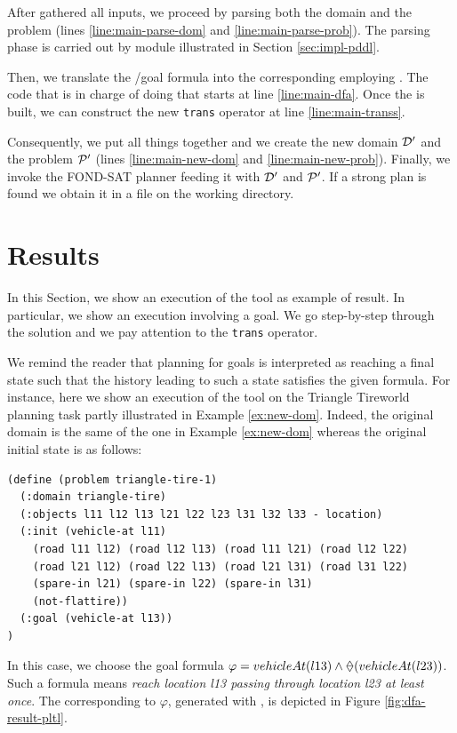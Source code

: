 After gathered all inputs, we proceed by parsing both the \PDDL domain and the \PDDL problem (lines \ref{line:main-parse-dom} and \ref{line:main-parse-prob}). The parsing phase is carried out by module illustrated in Section \ref{sec:impl-pddl}.

Then, we translate the \LTLf/\PLTL goal formula into the corresponding \DFA employing \LTLfToDFA. The code that is in charge of doing that starts at line \ref{line:main-dfa}. Once the \DFA is built, we can construct the new \texttt{trans} operator at line \ref{line:main-transs}.

Consequently, we put all things together and we create the new domain $\D'$ and the problem $\P'$ (lines \ref{line:main-new-dom} and \ref{line:main-new-prob}). Finally, we invoke the FOND-SAT planner feeding it with $\D'$ and $\P'$. If a strong plan is found we obtain it in a file on the working directory.

\section{Results}\label{sec:planning-results}
In this Section, we show an execution of the \FONDFOR tool as example of result. In particular, we show an execution involving a \PLTL goal. We go step-by-step through the solution and we pay  attention to the \texttt{trans} operator.

We remind the reader that \FONDS planning for \PLTL goals is interpreted as reaching a final state such that the history leading to such a state satisfies the given \PLTL formula.
For instance, here we show an execution of the \FONDFOR tool on the Triangle Tireworld planning task partly illustrated in Example \ref{ex:new-dom}. Indeed, the original domain is the same of the one in Example \ref{ex:new-dom} whereas the original initial state is as follows:
\begin{lstlisting}[language=PDDL, escapechar=£]
(define (problem triangle-tire-1)
  (:domain triangle-tire)
  (:objects l11 l12 l13 l21 l22 l23 l31 l32 l33 - location)
  (:init (vehicle-at l11)
    (road l11 l12) (road l12 l13) (road l11 l21) (road l12 l22)
    (road l21 l12) (road l22 l13) (road l21 l31) (road l31 l22)
    (spare-in l21) (spare-in l22) (spare-in l31)
    (not-flattire))
  (:goal (vehicle-at l13))
)
\end{lstlisting}
In this case, we choose the \PLTL goal formula $\varphi = vehicleAt(l13) \lAND \Once(vehicleAt(l23))$. Such a formula means \emph{reach location l13 passing through location l23 at least once}. The \DFA corresponding to $\varphi$, generated with \LTLfToDFA, is depicted in Figure \ref{fig:dfa-result-pltl}.

